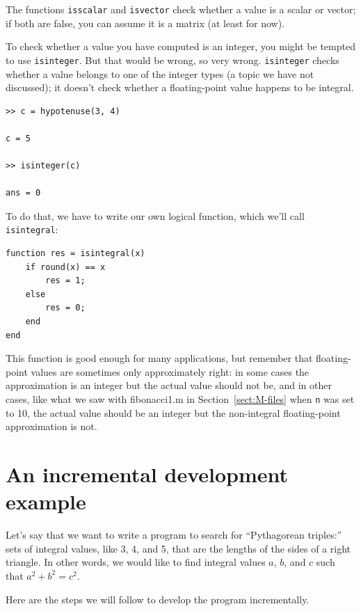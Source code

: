 \documentclass[
]{book}
\begin{document}
The functions {\tt isscalar} and {\tt isvector} check whether
a value is a scalar or vector; if both are false, you can assume
it is a matrix (at least for now).

To check whether a value you have computed is an integer, you might
be tempted to use {\tt isinteger}.  But that would be wrong, so very
wrong.  {\tt isinteger} checks whether a value belongs to one of
the integer types (a topic we have not discussed); it doesn't check
whether a floating-point value happens to be integral.

\begin{verbatim}
>> c = hypotenuse(3, 4)

c = 5

>> isinteger(c)

ans = 0
\end{verbatim}

To do that, we have to write our own logical function, which
we'll call {\tt isintegral}:

\begin{verbatim}
function res = isintegral(x)
    if round(x) == x
        res = 1;
    else
        res = 0;
    end
end
\end{verbatim}

This function is good enough for many applications, but remember
that floating-point values are
sometimes
only approximately right: in some
cases the approximation is an integer but the actual
value should not be,
and in other cases, like what we saw with fibonacci1.m in Section~\ref{sect:M-files} when {\tt n} was set to 10,
the actual value should be an integer but the non-integral floating-point
approximation is not.


\section{An incremental development example}
\label{sect:increxample}

Let's say that we want to write a program to search for ``Pythagorean
triples:'' sets of integral values, like 3, 4, and 5,
that are the lengths of the sides of a right triangle.  In other
words, we would like to find integral values $a$, $b$, and $c$ such
that $a^2 + b^2 = c^2$.

Here are the steps we will follow to develop the program incrementally.
\end{document}
